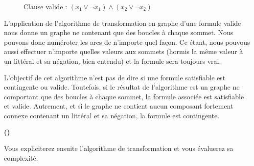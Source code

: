 \documentclass{article}
\newcounter{enoncecount}
\newcounter{sousenoncecount}
\newenvironment{sousenonce}
{%
\stepcounter{sousenoncecount}
\bf\small (\alph{sousenoncecount})
\begin{bf}
}
{%
\end{bf}
}
\begin{document}
\begin{figure}[h!]
  \centering
  \caption{Clause valide :  $(x_{1} \vee \neg x_{1}) \wedge (x_{2} \vee \neg x_{2})$}
  \label{fig:clause-valide}
\end{figure}


L'application de l'algorithme de transformation en graphe d'une formule valide nous donne un graphe ne contenant que des boucles à chaque sommet. Nous pouvons donc numéroter les arcs de n'importe quel façon. Ce étant, nous pouvous aussi effectuer n'importe quelles valeurs aux sommets (hormis la même valeur à un littéral et sa négation, bien entendu) et la formule sera toujours vrai. 

L'objectif de cet algorithme n'est pas de dire si une formule satisfiable est contingente ou valide. Toutefois, si le résultat de l'algorithme est un graphe ne comportant que des boucles à chaque sommet, la formule associée est satisfiable et valide. Autrement, et si le graphe ne contient aucun composant fortement connexe contenant un littéral et sa négation, la formule est contingente.

\begin{sousenonce}
Vous expliciterez ensuite l'algorithme de transformation et vous évaluerez sa complexité.
\end{sousenonce}
\end{document}
